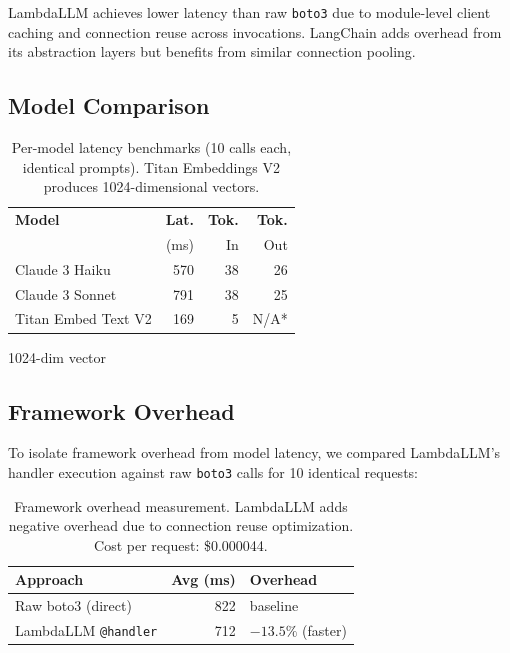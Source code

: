 \documentclass[10pt,twocolumn,letterpaper]{article}
\begin{document}
LambdaLLM achieves lower latency than raw \texttt{boto3} due to module-level client caching and connection reuse across invocations. LangChain adds overhead from its abstraction layers but benefits from similar connection pooling.

\subsection{Model Comparison}

\begin{table}[h]
\centering
\small
\caption{Per-model latency benchmarks (10 calls each, identical prompts). Titan Embeddings V2 produces 1024-dimensional vectors.}
\label{tab:models}
\begin{tabular}{lrrr}
\toprule
\textbf{Model} & \textbf{Lat.} & \textbf{Tok.} & \textbf{Tok.} \\
               & (ms)          & In            & Out           \\
\midrule
Claude 3 Haiku       & 570 & 38 & 26 \\
Claude 3 Sonnet      & 791 & 38 & 25 \\
Titan Embed Text V2  & 169 & 5  & N/A* \\
\bottomrule
\end{tabular}
\par\smallskip
\raggedright\scriptsize *1024-dim vector
\end{table}

\subsection{Framework Overhead}

To isolate framework overhead from model latency, we compared LambdaLLM's handler execution against raw \texttt{boto3} calls for 10 identical requests:

\begin{table}[h]
\centering
\small
\caption{Framework overhead measurement. LambdaLLM adds negative overhead due to connection reuse optimization. Cost per request: \$0.000044.}
\label{tab:overhead}
\begin{tabular}{lrl}
\toprule
\textbf{Approach} & \textbf{Avg (ms)} & \textbf{Overhead} \\
\midrule
Raw boto3 (direct)    & 822 & baseline       \\
LambdaLLM \texttt{@handler} & 712 & $-13.5\%$ (faster) \\
\bottomrule
\end{tabular}
\end{table}
\end{document}
